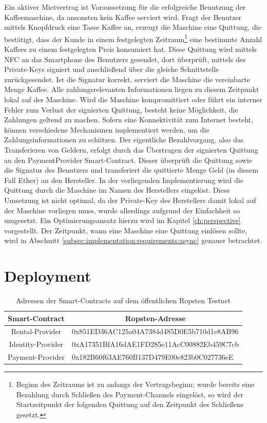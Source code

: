 Ein aktiver Mietvertrag ist Voraussetzung für die erfolgreiche Benutzung der Kaffeemaschine, da ansonsten kein Kaffee serviert wird. Fragt der Benutzer mittels Knopfdruck eine Tasse Kaffee an, erzeugt die Maschine eine Quittung, die bestätigt, dass der Kunde in einem festgelegten Zeitraum\footnote{Beginn des Zeitraums ist zu anfangs der Vertragsbeginn; wurde bereits eine Bezahlung durch Schließen des Payment-Channels eingelöst, so wird der Startzeitpunkt der folgenden Quittung auf den Zeitpunkt des Schließens gesetzt.} eine bestimmte Anzahl Kaffees zu einem festgelegten Preis konsumiert hat. Diese Quittung wird mittels \ac{NFC} an das Smartphone des Benutzers gesendet, dort überprüft, mittels des Private-Keys signiert und anschließend über die gleiche Schnittstelle zurückgesendet. Ist die Signatur korrekt, serviert die Maschine die vereinbarte Menge Kaffee. Alle zahlungsrelevanten Informationen liegen zu diesem Zeitpunkt lokal auf der Maschine. Wird die Maschine kompromittiert oder führt ein interner Fehler zum Verlust der signierten Quittung, besteht keine Möglichkeit, die Zahlungen geltend zu machen. Sofern eine Konnektivität zum Internet besteht, können verschiedene Mechanismen implementiert werden, um die Zahlungsinformationen zu schützen. Der eigentliche Bezahlvorgang, also das Transferieren von Geldern, erfolgt durch das Übertragen der signierten Quittung an den PaymentProvider Smart-Contract. Dieser überprüft die Quittung sowie die Signatur des Benutzers und transferiert die quittierte Menge Geld (in diesem Fall Ether) an den Hersteller. In der vorliegenden Implementierung wird die Quittung durch die Maschine im Namen des Herstellers eingelöst. Diese Umsetzung ist nicht optimal, da der Private-Key des Herstellers damit lokal auf der Maschine vorliegen muss, wurde allerdings aufgrund der Einfachheit so umgesetzt. Ein Optimierungsansatz hierzu wird im Kapitel \ref{ch:perspective} vorgestellt. Der Zeitpunkt, wann eine Maschine eine Quittung einlösen sollte, wird in Abschnitt \ref{subsec:implementation:requirements:async} genauer betrachtet.

\newpage

\section{Deployment}
\label{sec:appendix:implementation:deployment}

\begin{table}[h]
  \caption{Adressen der Smart-Contracts auf dem öffentlichen Ropsten Testnet}
\label{tab:ropsten}
\begin{tabular}{@{}cl@{}}
\toprule
\textbf{Smart-Contract} & \multicolumn{1}{c}{\textbf{Ropsten-Adresse}} \\ \midrule
Rental-Provider & 0x851ED36AC125a04A7384d485D0E5b710d1e8AB96 \\
Identity-Provider & 0xA17351BfA16dAE1FD285e11AcC00882Eb459C7cb \\
Payment-Provider & 0x182B60f63AE760B137D479E00e823b0C027736eE \\ \bottomrule
\end{tabular}

\end{table}


